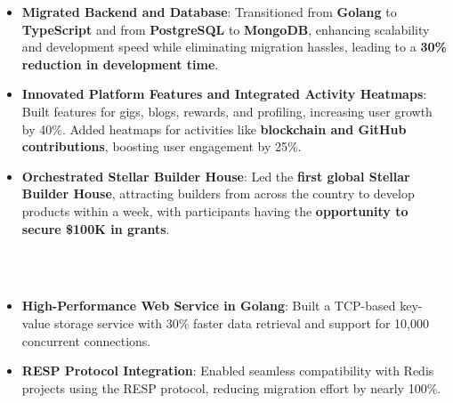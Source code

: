 \documentclass[10pt,a4paper,ragged2e,withhyper]{altacv}
\begin{document}
\begin{paracol}{2}
\begin{itemize}

\item \textbf{Migrated Backend and Database}: Transitioned from \textbf{Golang} to \textbf{TypeScript} and from \textbf{PostgreSQL} to \textbf{MongoDB}, enhancing scalability and development speed while eliminating migration hassles, leading to a \textbf{30\% reduction in development time}.

\item \textbf{Innovated Platform Features and Integrated Activity Heatmaps}: Built features for gigs, blogs, rewards, and profiling, increasing user growth by 40\%. Added heatmaps for activities like \textbf{blockchain and GitHub contributions}, boosting user engagement by 25\%.

\item \textbf{Orchestrated Stellar Builder House}: Led the \textbf{first global Stellar Builder House}, attracting builders from across the country to develop products within a week, with participants having the \textbf{opportunity to secure \$100K in grants}.

\end{itemize}

\switchcolumn


\\
\

\smallskip


\begin{itemize}
\item \textbf{High-Performance Web Service in Golang}: Built a TCP-based key-value storage service with 30\% faster data retrieval and support for 10,000 concurrent connections.
\item \textbf{RESP Protocol Integration}: Enabled seamless compatibility with Redis projects using the RESP protocol, reducing migration effort by nearly 100\%.
\end{itemize}


\end{paracol}
\end{document}
